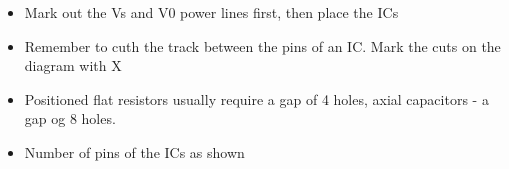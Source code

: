 \documentclass[a4paper]{article}
\begin{document}
  \clearpage

  \begin{itemize}
    \item Mark out the Vs and V0 power lines first, then place the ICs
    \item Remember to cuth the track between the pins of an IC. Mark the cuts on the diagram with X
    \item Positioned flat resistors usually require a gap of 4 holes, axial capacitors - a gap og 8 holes.
    \item Number of pins of the ICs as shown
  \end{itemize}
\end{document}

